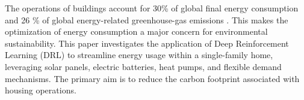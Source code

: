 The operations of buildings account for 30\% of global final energy consumption and 26 \%
of global energy-related greenhouse-gas emissions \cite{IEA.06.01.2024}. This makes the optimization of energy consumption a major concern for environmental sustainability. This paper investigates the application of Deep Reinforcement Learning (DRL) to streamline energy usage within a single-family home, leveraging solar panels, electric batteries, heat pumps, and flexible demand mechanisms. The primary aim is to reduce the carbon footprint associated with housing operations.